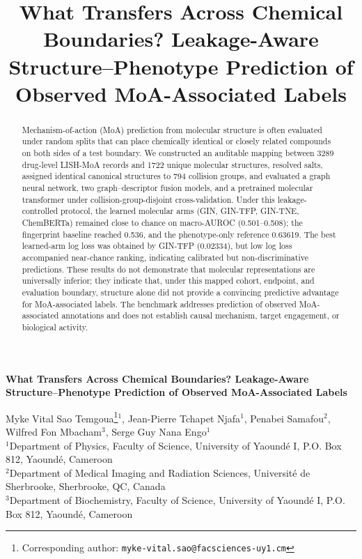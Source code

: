 \documentclass[11pt,a4paper]{article}
\title{What Transfers Across Chemical Boundaries? Leakage-Aware Structure--Phenotype Prediction of Observed MoA-Associated Labels}
\date{}
\begin{document}
{\centering\Large\bfseries What Transfers Across Chemical Boundaries? Leakage-Aware Structure--Phenotype Prediction of Observed MoA-Associated Labels\par}
\vspace{1em}
{\centering
Myke Vital Sao Temgoua\thanks{Corresponding author: \texttt{myke-vital.sao@facsciences-uy1.cm}}$^{1}$,
Jean-Pierre Tchapet Njafa$^{1}$,
Penabei Samafou$^{2}$,
Wilfred Fon Mbacham$^{3}$,
Serge Guy Nana Engo$^{1}$\\[0.5em]
{\small $^{1}$Department of Physics, Faculty of Science, University of Yaound\'e I, P.O. Box 812, Yaound\'e, Cameroon}\\
{\small $^{2}$Department of Medical Imaging and Radiation Sciences, Universit\'e de Sherbrooke, Sherbrooke, QC, Canada}\\
{\small $^{3}$Department of Biochemistry, Faculty of Science, University of Yaound\'e I, P.O. Box 812, Yaound\'e, Cameroon}\par}

\begin{abstract}
Mechanism-of-action (MoA) prediction from molecular structure is often evaluated under random splits that can place chemically identical or closely related compounds on both sides of a test boundary. We constructed an auditable mapping between \num{3289} drug-level LISH-MoA records and \num{1722} unique molecular structures, resolved salts, assigned identical canonical structures to \num{794} collision groups, and evaluated a graph neural network, two graph--descriptor fusion models, and a pretrained molecular transformer under collision-group-disjoint cross-validation. Under this leakage-controlled protocol, the learned molecular arms (GIN, GIN-TFP, GIN-TNE, ChemBERTa) remained close to chance on macro-AUROC (\num{0.501}--\num{0.508}); the fingerprint baseline reached \num{0.536}, and the phenotype-only reference \num{0.63619}. The best learned-arm log loss was obtained by GIN-TFP (\num{0.02334}), but low log loss accompanied near-chance ranking, indicating calibrated but non-discriminative predictions. These results do not demonstrate that molecular representations are universally inferior; they indicate that, under this mapped cohort, endpoint, and evaluation boundary, structure alone did not provide a convincing predictive advantage for MoA-associated labels. The benchmark addresses prediction of observed MoA-associated annotations and does not establish causal mechanism, target engagement, or biological activity.
\end{abstract}
\end{document}
